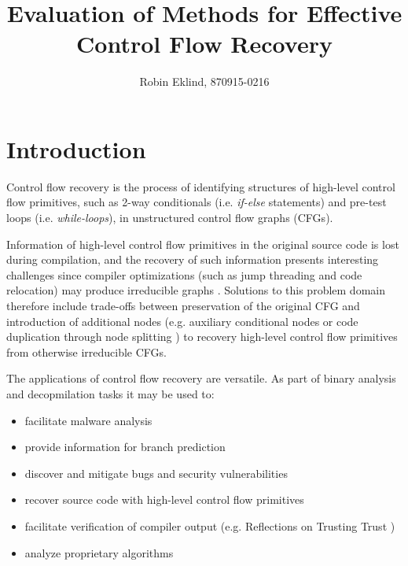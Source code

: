 \documentclass[12pt, a4paper]{article}
\title{Evaluation of Methods for Effective Control Flow Recovery}
\author{Robin Eklind, 870915-0216}
\begin{document}
\maketitle

\clearpage

\tableofcontents

\clearpage


\section{Introduction}

Control flow recovery is the process of identifying structures of high-level control flow primitives, such as 2-way conditionals (i.e. \textit{if-else} statements) and pre-test loops (i.e. \textit{while-loops}), in unstructured control flow graphs (CFGs).

Information of high-level control flow primitives in the original source code is lost during compilation, and the recovery of such information presents interesting challenges since compiler optimizations (such as jump threading and code relocation) may produce irreducible graphs \cite{cifuentes_reverse_comp}. Solutions to this problem domain therefore include trade-offs between preservation of the original CFG and introduction of additional nodes (e.g. auxiliary conditional nodes \cite{no_more_gotos} or code duplication through node splitting \cite{node_splitting}) to recovery high-level control flow primitives from otherwise irreducible CFGs.

The applications of control flow recovery are versatile. As part of binary analysis and decopmilation tasks it may be used to:

\begin{itemize}
	\item facilitate malware analysis
	\item provide information for branch prediction
	\item discover and mitigate bugs and security vulnerabilities
	\item recover source code with high-level control flow primitives
	\item facilitate verification of compiler output (e.g. Reflections on Trusting Trust \cite{trusting_trust})
	\item analyze proprietary algorithms
\end{itemize}
\end{document}
